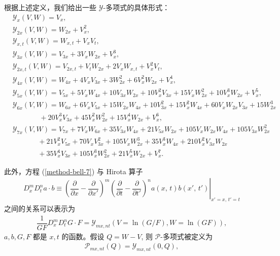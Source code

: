 根据上述定义，我们给出一些 $\mathcal{Y}$-多项式的具体形式：
\begin{align}
& \mathcal{Y}_x(V,W)=V_x, \label{method-bell-8}\\
& \mathcal{Y}_{2x}(V,W)=W_{2x}+V_x^2,\label{method-bell-9}\\
& \mathcal{Y}_{x,t}(V,W)=W_{x,t}+V_x V_t,\label{method-bell-10}\\
& \mathcal{Y}_{3x}(V,W)=V_{3x}+3 V_x W_{2x}+V_x^3,\label{method-bell-11}\\
& \mathcal{Y}_{2x,t}(V,W)=V_{2x,t}+V_t W_{2x}+2 V_x W_{x,t}+V_x^2 V_t,\label{method-bell-12}\\
& \mathcal{Y}_{4x}(V,W)=W_{4x}+4 V_x V_{3x}+3 W_{2x}^2+6 V_x^2 W_{2x}+V_x^4,\label{method-bell-13}\\
& \mathcal{Y}_{5x}(V,W)=V_{5x}+5 V_x W_{4x}+10 V_{3x} W_{2x}+10 V_x^2 V_{3x}+15 V_x W_{2x}^2+10 V_x^3 W_{2x}+V_x^5,\label{method-bell-14}
\end{align}
\begin{align}
& \mathcal{Y}_{6x}(V,W)=W_{6x}+6 V_x V_{5x}+15 W_{2x} W_{4x}+10 V_{3x}^2+15 V_x^2 W_{4x}+60 V_x W_{2x} V_{3x}+15 W_{2x}^3
\nonumber\\
&~~~~~~~~~~~~~~~~~
+20 V_{x}^3 V_{3x}+45 V_x^2 W_{2x}^2+15 V_x^4 W_{2x}+V_x^6,\nonumber\\
& \mathcal{Y}_{7x}(V,W)=V_{7x}+7 V_x W_{6x}+35 V_{3x} W_{4x}+21 V_{5x} W_{2x}+105 V_x W_{2x} W_{4x}+105 V_{3x} W_{2x}^2
\nonumber\\
&~~~~~~~~~~~~~~~~+21 V_x^2 V_{5x}+70 V_x V_{3x}^2+105 V_x W_{2x}^3+35 V_x^3 W_{4x}+210 V_x^2 V_{3x} W_{2x}
\nonumber\\
&~~~~~~~~~~~~~~~~
+35 V_x^4 V_{3x}+105 V_x^3 W_{2x}^2+21 V_x^5 W_{2x}+V_x^7.\label{method-bell-15}
\end{align}

此外，方程 (\ref{method-bell-7}) 与 Hirota 算子
\begin{align}
D_x^mD_t^na\cdot b\equiv \left.\left(\dfrac{\partial}{\partial x}-\dfrac{\partial}{\partial x'}\right)^m\left(\dfrac{\partial}{\partial t}-\dfrac{\partial}{\partial t'}\right)^na(x,\,t)b(x',\,t')\right|_{x'=x,\,t'=t}\label{method-bell-16}
\end{align}
之间的关系可以表示为
\begin{align}
\dfrac{1}{GF}D_x^mD_t^nG\cdot F=\mathcal{Y}_{mx,nt}(V=\ln(G/F),W=\ln(GF)),\label{method-bell-17}
\end{align}
$a, b, G, F$ 都是 $x, t$ 的函数。假设 $Q=W-V$, 则 $\mathcal{P}$-多项式被定义为
\begin{align}
\mathcal{P}_{mx,nt}(Q)=\mathcal{Y}_{mx,nt}(0,Q),\label{method-bell-18}
\end{align}

